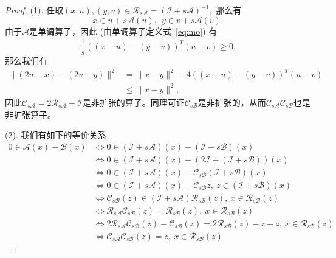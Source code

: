 \begin{proof}
(1). 任取$(x, u), (y, v) \in \mathcal{R}_{s\mathcal{A}} = (\mathcal{I} + s \mathcal{A})^{-1},$ 那么有
\begin{equation*}
x \in u + s\mathcal{A}(u), ~~ y \in v + s\mathcal{A}(v).
\end{equation*}
由于$\mathcal{A}$是单调算子，因此 (由单调算子定义式~\eqref{eq:mo}) 有
\begin{equation*}
\frac{1}{s}((x - u) - (y - v))^T (u - v) \geqslant 0.
\end{equation*}
那么我们有
\begin{align*}
\lVert (2u - x) - (2v - y) \rVert^2 & = \lVert x - y \rVert^2 - 4 ((x - u) - (y - v))^T (u - v) \\
& \leqslant \lVert x - y \rVert^2,
\end{align*}
因此$\mathcal{C}_{s\mathcal{A}} = 2 \mathcal{R}_{s\mathcal{A}} - \mathcal{I}$是非扩张的算子。同理可证$\mathcal{C}_{s\mathcal{B}}$是非扩张的，从而$\mathcal{C}_{s\mathcal{A}} \mathcal{C}_{s\mathcal{B}}$也是非扩张算子。

(2). 我们有如下的等价关系\cite{ryu2022large}
\begin{align*}
0 \in \mathcal{A}(x) + \mathcal{B}(x) & \Longleftrightarrow 0 \in (\mathcal{I} + s\mathcal{A})(x) - (\mathcal{I} - s\mathcal{B})(x) \\
& \Longleftrightarrow 0 \in (\mathcal{I} + s\mathcal{A})(x) - (2\mathcal{I} - (\mathcal{I} + s\mathcal{B}))(x) \\
& \Longleftrightarrow 0 \in (\mathcal{I} + s\mathcal{A})(x) - \mathcal{C}_{s\mathcal{B}} (\mathcal{I} + s\mathcal{B})(x) \\
& \Longleftrightarrow 0 \in (\mathcal{I} + s\mathcal{A})(x) - \mathcal{C}_{s\mathcal{B}} z, ~ z \in (\mathcal{I} + s\mathcal{B}) (x) \\
& \Longleftrightarrow \mathcal{C}_{s\mathcal{B}} (z) \in (\mathcal{I} + s\mathcal{A}) \mathcal{R}_{s\mathcal{B}} (z) , ~ x \in \mathcal{R}_{s\mathcal{B}} (z) \\
& \Longleftrightarrow \mathcal{R}_{s\mathcal{A}} \mathcal{C}_{s\mathcal{B}} (z) = \mathcal{R}_{s\mathcal{B}} (z), ~ x \in \mathcal{R}_{s\mathcal{B}} (z) \\
& \Longleftrightarrow 2\mathcal{R}_{s\mathcal{A}} \mathcal{C}_{s\mathcal{B}} (z) - \mathcal{C}_{s\mathcal{B}} (z) = 2 \mathcal{R}_{s\mathcal{B}} (z) - z + z, ~ x \in \mathcal{R}_{s\mathcal{B}} (z) \\
& \Longleftrightarrow \mathcal{C}_{s\mathcal{A}} \mathcal{C}_{s\mathcal{B}} (z) = z, ~ x \in \mathcal{R}_{s\mathcal{B}} (z)
\end{align*}
\end{proof}

